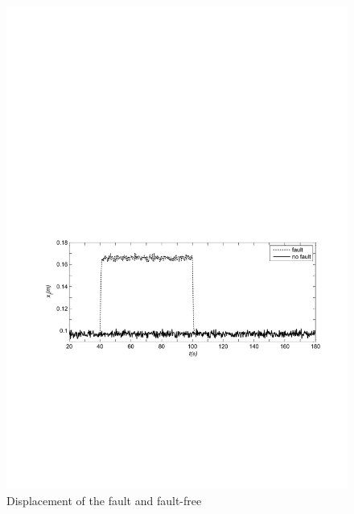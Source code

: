 \begin{figure}[!htb]
  \centering
  \includegraphics[width=\hsize]{MATLAB-fault1.pdf}
  \caption{Displacement of the fault and fault-free}
  \label{fig:fault1}
\end{figure}


